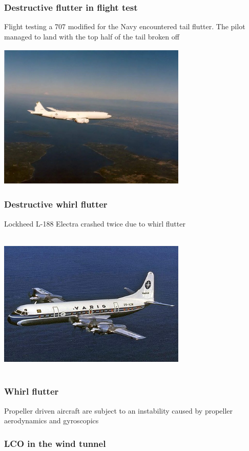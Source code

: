 \documentclass{beamer}
\begin{document}
\begin{frame}
	\frametitle{Destructive flutter in flight test}
	Flight testing a 707 modified for the Navy encountered tail flutter. The pilot
	managed to land with the top half of the tail broken off

 	\includegraphics[height=7cm,width=9cm]{e6.jpg}
\end{frame}

\begin{frame}
	\frametitle{Destructive whirl flutter}
	Lockheed L-188 Electra crashed twice due to whirl flutter

	\includegraphics[height=7cm,width=9cm]{lockheed-L188.jpg}
\end{frame}

\begin{frame}
	\frametitle{Whirl flutter}
	Propeller driven aircraft are subject to an instability caused
	by propeller aerodynamics and gyroscopics

\end{frame}

\begin{frame}
	\frametitle{LCO in the wind tunnel}
\end{frame}
\end{document}
